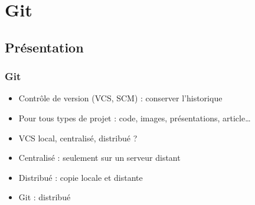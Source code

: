 \documentclass[english, french]{beamer}
\begin{document}
\section{Git}
\subsection{Présentation}
\begin{frame}
	\frametitle{Git}
	\begin{itemize}
		\item Contrôle de version (VCS, SCM) : conserver l’historique
		\item Pour tous types de projet : code, images, présentations, article…
		\item VCS local, centralisé, distribué ? \pause
		\item Centralisé : seulement sur un serveur distant
		\item Distribué : copie locale et distante
		\item Git : distribué
	\end{itemize}
\end{frame}
\end{document}
